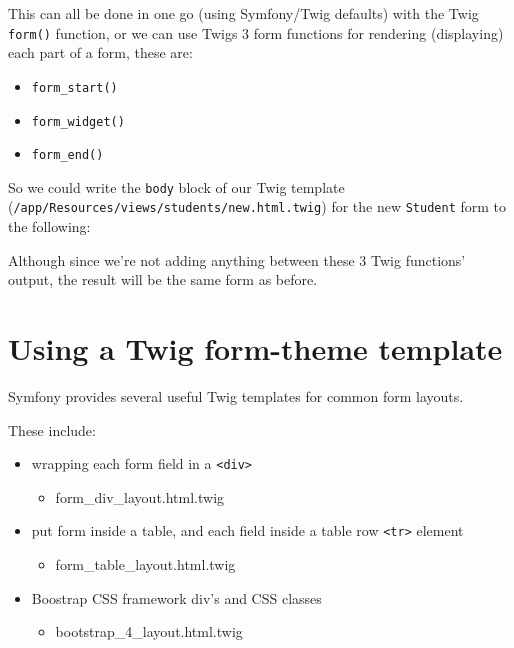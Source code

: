 \documentclass[a4paperpaper,openright]{book}
\newenvironment{Shaded}{}{}
\newcommand{\KeywordTok}[1]{\textcolor[rgb]{0.00,0.44,0.13}{\textbf{#1}}}
\newcommand{\NormalTok}[1]{#1}
\providecommand{\tightlist}{%
  \setlength{\itemsep}{0pt}\setlength{\parskip}{0pt}}
\begin{document}
This can all be done in one go (using Symfony/Twig defaults) with the
Twig \texttt{form()} function, or we can use Twigs 3 form functions for
rendering (displaying) each part of a form, these are:

\begin{itemize}
\tightlist
\item
  \texttt{form\_start()}
\item
  \texttt{form\_widget()}
\item
  \texttt{form\_end()}
\end{itemize}

So we could write the \texttt{body} block of our Twig template
(\texttt{/app/Resources/views/students/new.html.twig}) for the new
\texttt{Student} form to the following:

\begin{Shaded}
\end{Shaded}

Although since we're not adding anything between these 3 Twig functions'
output, the result will be the same form as before.

\hypertarget{using-a-twig-form-theme-template}{%
\section{Using a Twig form-theme
template}\label{using-a-twig-form-theme-template}}

Symfony provides several useful Twig templates for common form layouts.

These include:

\begin{itemize}
\tightlist
\item
  wrapping each form field in a \texttt{\textless{}div\textgreater{}}

  \begin{itemize}
  \tightlist
  \item
    form\_div\_layout.html.twig
  \end{itemize}
\item
  put form inside a table, and each field inside a table row
  \texttt{\textless{}tr\textgreater{}} element

  \begin{itemize}
  \tightlist
  \item
    form\_table\_layout.html.twig
  \end{itemize}
\item
  Boostrap CSS framework div's and CSS classes

  \begin{itemize}
  \tightlist
  \item
    bootstrap\_4\_layout.html.twig
  \end{itemize}
\end{itemize}
\end{document}
